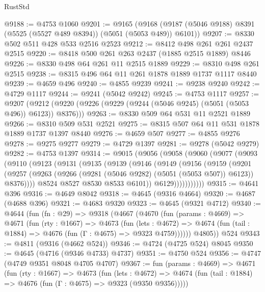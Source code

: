 \begin{lexlean}{RustStd}
\begin{coremodule}
@9188 := @4753 @1060
@9201 := @9165
    (@9168 (@9187 (@5046 @9188) @8391 (@5525 (@5527 @489 @8394)) (@5051 (@5053 @489)) @6101))
@9207 := @8330 @502 @511 @428 @533 @2516 @2523
@9212 := @8412 @498 @261 @261 @2437 @2515
@9220 := @8418 @500 @261 @263 @2437 (@1885 @2515 @1889) @8446
@9226 := @8330 @498 @64 @261 @11 @2515 @1889
@9229 := @8310 @498 @261 @2515
@9238 := @8315 @496 @64 @11 @261 @1878 @1889 @1737 @1117 @8440
@9239 := @4659 @496
@9240 := @4855 @9239
@9241 := @9238 @9240
@9242 := @4729 @1117
@9244 := @9241 (@5042 @9242)
@9245 := @4753 @1117
@9257 := @9207
    (@9212 (@9220 (@9226 (@9229 (@9244 (@5046 @9245) (@5051 (@5053 @496)) @6123)) @8376)))
@9263 := @8330 @509 @64 @531 @11 @2521 @1889
@9266 := @8310 @509 @531 @2521
@9275 := @8315 @507 @64 @11 @531 @1878 @1889 @1737 @1397 @8440
@9276 := @4659 @507
@9277 := @4855 @9276
@9278 := @9275 @9277
@9279 := @4729 @1397
@9281 := @9278 (@5042 @9279)
@9282 := @4753 @1397
@9314 := @9015
    (@9056
      (@9058
        (@9060
          (@9077
            (@9093
              (@9110
                (@9123
                  (@9131
                    (@9135
                      (@9139
                        (@9146
                          (@9149
                            (@9156
                              (@9159
                                (@9201
                                  (@9257
                                    (@9263
                                      (@9266 (@9281 (@5046 @9282) (@5051 (@5053 @507)) @6123))
                                      @8376))))
                              @8524
                              @8527
                              @8530
                              @8533
                              @6101))
                          @6129)))))))))))
@9315 := @4641 @396
@9316 := @4649 @8042
@9318 := @4645 (@9316 @4664)
@9320 := @4687 (@4688 @396)
@9321 := @4683 @9320
@9323 := @4645 (@9321 @4712)
@9340 := @4644
    (fun (fn : @29) =>
    @9318
      (@4667
        (@4670
          (fun (params : @4669) =>
          @4671
            (fun (rty : @1667) =>
            @4673
              (fun (lets : @4672) =>
              @4674 (fun (tail : @1884) => @4676 (fun (Γ : @4675) => @9323 @4759))))))
        @4805))
    @524
@9343 := @4811 (@9316 (@4662 @524))
@9346 := @4724 (@4725 @524) @8045
@9350 := @4645 (@4716 (@9346 @4733) @4737)
@9351 := @4750 @524
@9356 := @4747 (@4749 @9351 @8048 @4705 @4707)
@9367 := fun (params : @4669) =>
  @4671
    (fun (rty : @1667) =>
    @4673
      (fun (lets : @4672) =>
      @4674 (fun (tail : @1884) => @4676 (fun (Γ : @4675) => @9323 (@9350 @9356)))))

\end{coremodule}
\end{lexlean}
